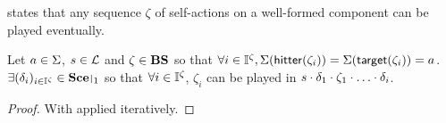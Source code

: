  states that any sequence $\zeta$ of self-actions on a well-formed component can be played eventually.
\begin{theorem}
\label{th:autohits}
  Let $a \in \Sigma$, $s \in \mathcal{L}$ and $\zeta \in \mathbf{BS}$ so that $\forall i \in \mathbb{I}^{\zeta}, \Sigma(\mathsf{hitter}(\zeta_i)) = \Sigma(\mathsf{target}(\zeta_i)) = a$.
  $\exists (\delta_i)_{i \in \indexes{\zeta}} \in \restriction{\Sce}{1}$ so that $\forall i \in \mathbb{I}^{\zeta}$, $\zeta_i$ can be played in $s \PHplay \delta_1 \PHplay \zeta_1 \PHplay \dots \PHplay \delta_i$. 
\end{theorem}
\begin{proof}
  With  applied iteratively.
\end{proof}

